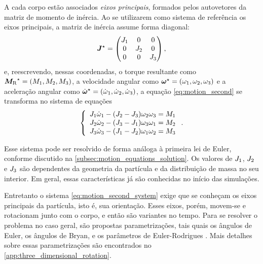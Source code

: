 A cada corpo estão associados \textit{eixos principais}, formados pelos autovetores da matriz de momento de inércia. Ao se utilizarem como sistema de referência os eixos principais, a matriz de inércia assume forma diagonal:
\begin{equation*}
	{\bm{J}}^\star =
	\begin{pmatrix}
		J_1 & 0 & 0 \\
		0 & J_2 & 0 \\
		0 & 0 & J_3 \\
	\end{pmatrix},
\end{equation*}
e, reescrevendo, nessas coordenadas, o torque resultante como \(\principal{\resultingTorque} = \explicitVectorPrincipalCoordinates{\torqueScalar}\), a velocidade angular como \(\principal{\angularVelocity} = \explicitVectorPrincipalCoordinates{\angularVelocityScalar}\) e a aceleração angular como \(\principal{\angularAcceleration} = \explicitVectorPrincipalCoordinates{\deriv{1}{\angularVelocityScalar}}\), a equação \eqref{eq:motion_second} se transforma no sistema de equações
\begin{equation} \label{eq:motion_second_system}
	\left\lbrace
	\begin{array}{l}
		\momentOfInertia_1\deriv{1}{\angularVelocityScalar}_1 - \pqty{\momentOfInertia_2 - \momentOfInertia_3}\angularVelocityScalar_2\angularVelocityScalar_3 = \torqueScalar_1 \\
		\momentOfInertia_2\deriv{1}{\angularVelocityScalar}_2 - \pqty{\momentOfInertia_3 - \momentOfInertia_1}\angularVelocityScalar_3\angularVelocityScalar_1 = \torqueScalar_2 \\
		\momentOfInertia_3\deriv{1}{\angularVelocityScalar}_3 - \pqty{\momentOfInertia_1 - \momentOfInertia_2}\angularVelocityScalar_1\angularVelocityScalar_2 = \torqueScalar_3
	\end{array}
	\right.
	.
\end{equation}

Esse sistema pode ser resolvido de forma análoga à primeira lei de Euler, conforme discutido na \autoref{subsec:motion_equations_solution}. Os valores de \(J_1\), \(J_2\) e \(J_3\) são dependentes da geometria da partícula e da distribuição de massa no seu interior. Em geral, essas características já são conhecidas no início das simulações.

Entretanto o sistema \eqref{eq:motion_second_system} exige que se conheçam os eixos principais da partícula, isto é, sua orientação. Esses eixos, porém, movem-se e rotacionam junto com o corpo, e então são variantes no tempo. Para se resolver o problema no caso geral, são propostas parametrizações, tais quais os ângulos de Euler, os ângulos de Bryan, e os parâmetros de Euler-Rodrigues \cite{bib:dynamics_of_multibody_systems}. Mais detalhes sobre essas parametrizações são encontrados no \autoref{app:three_dimensional_rotation}.

